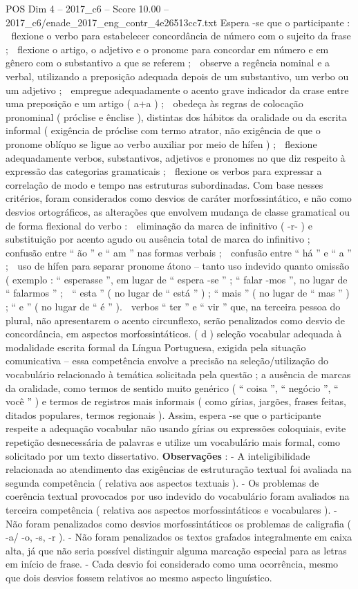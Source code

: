 \begin{textsample}{POS Dim 4 – 2017\_c6 – Score 10.00 – 2017\_c6/enade\_2017\_eng\_contr\_4e26513cc7.txt}
Espera -se que o participante :  flexione o verbo para estabelecer concordância de número com o sujeito da frase ;  flexione o artigo, o adjetivo e o pronome para concordar em número e em gênero com o substantivo a que se referem ;  observe a regência nominal e a verbal, utilizando a preposição adequada depois de um substantivo, um verbo ou um adjetivo ;  empregue adequadamente o acento grave indicador da crase entre uma preposição e um artigo ( a+a ) ;  obedeça às regras de colocação pronominal ( próclise e ênclise ), distintas dos hábitos da oralidade ou da escrita informal ( exigência de próclise com termo atrator, não exigência de que o pronome oblíquo se ligue ao verbo auxiliar por meio de hífen ) ;  flexione adequadamente verbos, substantivos, adjetivos e pronomes no que diz respeito à expressão das categorias gramaticais ;  flexione os verbos para expressar a correlação de modo e tempo nas estruturas subordinadas.
Com base nesses critérios, foram considerados como desvios de caráter morfossintático, e não como desvios ortográficos, as alterações que envolvem mudança de classe gramatical ou de forma flexional do verbo :  eliminação da marca de infinitivo ( -r- ) e substituição por acento agudo ou ausência total de marca do infinitivo ;  confusão entre “ ão ” e “ am ” nas formas verbais ;  confusão entre “ há ” e “ a ” ;  uso de hífen para separar pronome átono – tanto uso indevido quanto omissão ( exemplo : “ esperasse ”, em lugar de “ espera -se ” ; “ falar -mos ”, no lugar de “ falarmos ” ;  “ esta ” ( no lugar de “ está ” ) ; “ mais ” ( no lugar de “ mas ” ) ; “ e ” ( no lugar de “ é ” ).  verbos “ ter ” e “ vir ” que, na terceira pessoa do plural, não apresentarem o acento circunflexo, serão penalizados como desvio de concordância, em aspectos morfossintáticos. ( d ) seleção vocabular adequada à modalidade escrita formal da Língua Portuguesa, exigida pela situação comunicativa – essa competência envolve a precisão na seleção/utilização do vocabulário relacionado à temática solicitada pela questão ; a ausência de marcas da oralidade, como termos de sentido muito genérico ( “ coisa ”, “ negócio ”, “ você ” ) e termos de registros mais informais ( como gírias, jargões, frases feitas, ditados populares, termos regionais ).
Assim, espera -se que o participante respeite a adequação vocabular não usando gírias ou expressões coloquiais, evite repetição desnecessária de palavras e utilize um vocabulário mais formal, como solicitado por um texto dissertativo. \textbf{Observações} : - A inteligibilidade relacionada ao atendimento das exigências de estruturação textual foi avaliada na segunda competência ( relativa aos aspectos textuais ). - Os problemas de coerência textual provocados por uso indevido do vocabulário foram avaliados na terceira competência ( relativa aos aspectos morfossintáticos e vocabulares ). - Não foram penalizados como desvios morfossintáticos os problemas de caligrafia ( -a/ -o, -s, -r ). - Não foram penalizados os textos grafados integralmente em caixa alta, já que não seria possível distinguir alguma marcação especial para as letras em início de frase. - Cada desvio foi considerado como uma ocorrência, mesmo que dois desvios fossem relativos ao mesmo aspecto linguístico.

\end{textsample}

